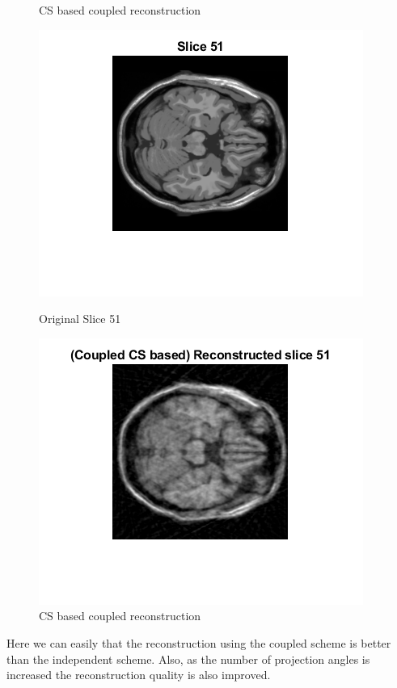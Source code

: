 \documentclass[12pt]{article}
\begin{document}
\begin{enumerate}[label = (\alph*)]
\begin{figure}[H]
\begin{minipage}{.45\textwidth}
            \caption*{CS based coupled reconstruction}
        \end{minipage}
    \end{figure}
    \begin{figure}[H]
        \centering
        \begin{minipage}{.45\textwidth}
            \centering
            \includegraphics[width=\linewidth]{Images/Q3_51.png}
            \caption*{Original Slice 51}
        \end{minipage}
        \begin{minipage}{.45\textwidth}
            \centering
            \includegraphics[width=\linewidth]{Images/Q3_Extra_51_c.png}
            \caption*{CS based coupled reconstruction}
        \end{minipage}
    \end{figure}
    \end{enumerate}
    
    Here we can easily that the reconstruction using the coupled scheme is better than the independent scheme. Also, as the number of projection angles is increased the reconstruction quality is also improved.
\end{document}

